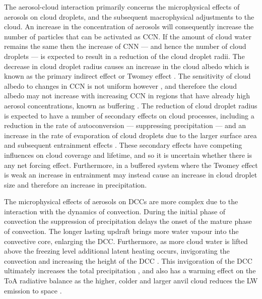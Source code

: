 The aerosol-cloud interaction primarily concerns the microphysical effects of aerosols on cloud droplets, and the subsequent macrophysical adjustments to the cloud.
An increase in the concentration of aerosols will consequently increase the number of particles that can be activated as CCN.
If the amount of cloud water remains the same then the increase of CNN --- and hence the number of cloud droplets --- is expected to result in a reduction of the cloud droplet radii.
The decrease in cloud droplet radius causes an increase in the cloud albedo which is known as the primary indirect effect or Twomey effect \citep{twomey_pollution_1974}.
The sensitivity of cloud albedo to changes in CCN is not uniform however \citep{twomey_aerosols_1991}, and therefore the cloud albedo may not increase with increasing CCN in regions that have already high aerosol concentrations, known as buffering \citep{stevens_untangling_2009}.
The reduction of cloud droplet radius is expected to have a number of secondary effects on cloud processes, including a reduction in the rate of autoconversion --- suppressing precipitation \citep{albrecht_aerosols_1989} --- and an increase in the rate of evaporation of cloud droplets due to the larger surface area and subsequent entrainment effects \citep{ackerman_impact_2004}.
These secondary effects have competing influences on cloud coverage and lifetime, and so it is uncertain whether there is any net forcing effect.
Furthermore, in a buffered system where the Twomey effect is weak an increase in entrainment may instead cause an increase in cloud droplet size \citep{jia_is_2019} and therefore an increase in precipitation.

The microphysical effects of aerosols on DCCs are more complex due to the interaction with the dynamics of convection.
During the initial phase of convection the suppression of precipitation delays the onset of the mature phase of convection.
The longer lasting updraft brings more water vapour into the convective core, enlarging the DCC.
Furthermore, as more cloud water is lifted above the freezing level additional latent heating occurs, invigorating the convection and increasing the height of the DCC \citep{khain2005aerosol}.
This invigoration of the DCC ultimately increases the total precipitation \citep{koren_aerosol_2005}, and also has a warming effect on the ToA radiative balance as the higher, colder and larger anvil cloud reduces the LW emission to space \citep{rosenfeld_flood_2008,fan_microphysical_2013}.


